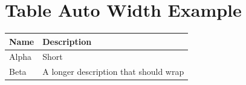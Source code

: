 \section{Table Auto Width Example}\label{table-auto-width-example}

{\def\LTcaptype{none} %
\begin{longtable}[]{@{}
  >{\raggedright\arraybackslash}p{}
  >{\raggedleft\arraybackslash}p{}@{}}
\toprule\noalign{}
\begin{minipage}[b]{\linewidth}\raggedright
Name
\end{minipage} & \begin{minipage}[b]{\linewidth}\raggedleft
Description
\end{minipage} \\
\midrule\noalign{}
\endhead
\bottomrule\noalign{}
\endlastfoot
Alpha & Short \\
Beta & A longer description that should wrap \\
\end{longtable}
}
